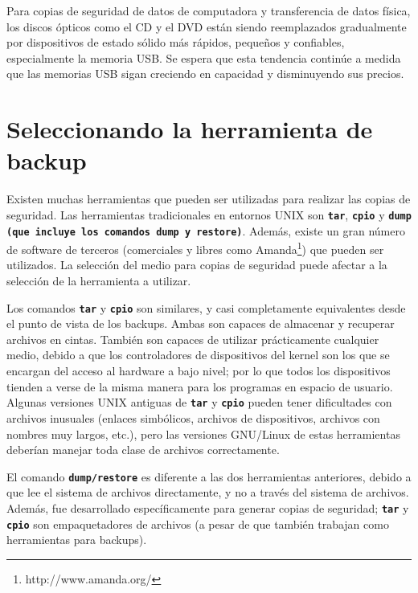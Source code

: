 \documentclass[12pt]{article}
\begin{document}
Para copias de seguridad de datos de computadora y transferencia de datos 
física, los discos ópticos como el CD y el DVD están siendo reemplazados 
gradualmente por dispositivos de estado sólido más rápidos, pequeños y 
confiables, especialmente la memoria USB. Se espera que esta tendencia 
continúe a medida que las memorias USB sigan creciendo en capacidad y 
disminuyendo sus precios. 
	
\section*{Seleccionando la herramienta de backup}

Existen muchas herramientas que pueden ser utilizadas para realizar las 
copias de seguridad.  Las herramientas tradicionales en entornos UNIX 
son \texttt{\textbf{tar}}, \texttt{\textbf{cpio}} y \texttt{\textbf{dump (que incluye los comandos 
dump y restore)}}.
 Además, existe un gran 
número de software de terceros (comerciales y libres como
 Amanda\footnote{http://www.amanda.org/}) que pueden ser 
utilizados. La selección del medio para copias de seguridad puede afectar 
a la selección de la herramienta a utilizar.

Los comandos \texttt{\textbf{tar}} y \texttt{\textbf{cpio}}
son similares, y casi completamente equivalentes desde el punto de 
vista de los backups. Ambas son capaces de almacenar y recuperar 
archivos en cintas. También son capaces de utilizar 
prácticamente cualquier medio, debido a que los controladores de 
dispositivos del kernel son los que se encargan del acceso al hardware a 
bajo nivel; por lo que todos los dispositivos
tienden a verse de la misma manera para los programas en espacio de usuario.
Algunas versiones  UNIX antiguas de \texttt{\textbf{tar}} y 
\texttt{\textbf{cpio}} pueden tener dificultades con archivos inusuales 
(enlaces simbólicos, archivos de dispositivos, archivos con nombres
muy largos, etc.), pero las versiones GNU/Linux de estas herramientas 
deberían manejar toda clase de archivos correctamente.

El comando \texttt{\textbf{dump/restore}} es diferente a las dos herramientas 
anteriores, debido a que lee el sistema de archivos directamente, y no a 
través del sistema de archivos.  Además, fue desarrollado específicamente 
para generar copias de seguridad; \texttt{\textbf{tar}} y 
\texttt{\textbf{cpio}} son empaquetadores de archivos 
(a pesar de que también trabajan como herramientas para backups).
\end{document}
